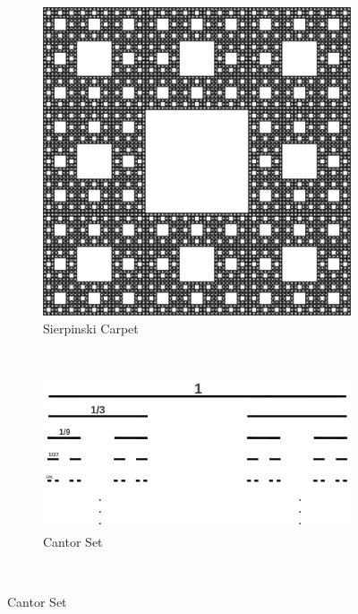 \documentclass[a4paper]{article}
\begin{document}
\begin{figure}[h]
    \centering
    \begin{subfigure}[h]{0.3\textwidth}
        \includegraphics[width=\textwidth]{sierpinski_carpet}
        \caption{Sierpinski Carpet}
        \label{fig:gull}
    \end{subfigure}%
    ~ %
    \begin{subfigure}[h]{0.3\textwidth}
        \includegraphics[width=\textwidth]{CantorSet}
        \caption{Cantor Set}
        \label{fig:tiger}
    \end{subfigure}
    ~ %

\end{figure}
\end{document}
